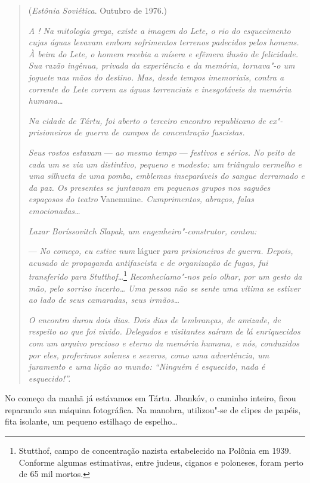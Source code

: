 \begin{quotation}
\begin{flushright}
(\emph{Estônia Soviética}. Outubro de 1976.)
\end{flushright}
\vspace{4pt}
\noindent\emph{A ! Na mitologia grega, existe a imagem
do Lete, o rio do esquecimento cujas águas levavam embora sofrimentos
terrenos padecidos pelos homens. À beira do Lete, o homem recebia a
mísera e efêmera ilusão de felicidade. Sua razão ingênua, privada da
experiência e da memória, tornava"-o um joguete nas mãos do destino. Mas,
desde tempos imemoriais, contra a corrente do Lete correm as águas
torrenciais e inesgotáveis da memória humana\ldots{}}

\emph{Na cidade de Tártu, foi aberto o terceiro encontro republicano de
ex"-prisioneiros de guerra de campos de concentração fascistas.}

\emph{Seus rostos estavam} --- \emph{ao mesmo tempo} --- \emph{festivos
e sérios. No peito de cada um se via um distintivo, pequeno e modesto:
um triângulo vermelho e uma silhueta de uma pomba, emblemas inseparáveis
do sangue derramado e da paz. Os presentes se juntavam em pequenos
grupos nos saguões espaçosos do teatro} Vanemuine\emph{. Cumprimentos,
abraços, falas emocionadas\ldots{}}

\emph{Lazar Boríssovitch Slapak, um engenheiro"-construtor, contou:}

--- \emph{No começo, eu estive num} láguer \emph{para prisioneiros de
guerra. Depois, acusado de propaganda antifascista e de organização de
fugas, fui transferido para Stutthof\ldots{}}\footnote{Stutthof, campo
  de concentração nazista estabelecido na Polônia em 1939. Conforme
  algumas estimativas, entre judeus, ciganos e poloneses, foram perto de
  65 mil mortos.} \emph{Reconhecíamo"-nos pelo olhar, por um gesto da
mão, pelo sorriso incerto\ldots{} Uma pessoa não se sente uma vítima se
estiver ao lado de seus camaradas, seus irmãos\ldots{}}

\emph{O encontro durou dois dias. Dois dias de lembranças, de amizade,
de respeito ao que foi vivido. Delegados e visitantes saíram de lá
enriquecidos com um arquivo precioso e eterno da memória humana, e nós,
conduzidos por eles, proferimos solenes e severos, como uma advertência,
um juramento e uma lição ao mundo: ``Ninguém é esquecido, nada é
esquecido!''.}
\end{quotation}

No começo da manhã já estávamos em Tártu. Jbankóv, o caminho inteiro,
ficou reparando sua máquina fotográfica. Na manobra, utilizou"-se de
clipes de papéis, fita isolante, um pequeno estilhaço de espelho\ldots{}

